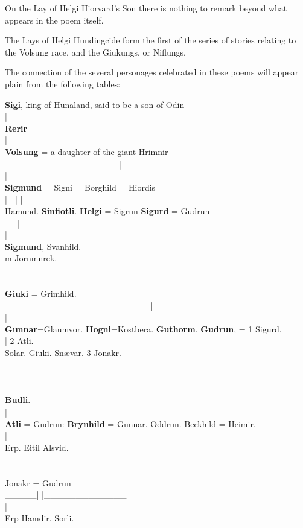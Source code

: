 On the Lay of Helgi Hiorvard's Son there is nothing to remark beyond
what appears in the poem itself.

The Lays of Helgi Hundingcide form the first of the series of stories
relating to the Volsung race, and the Giukungs, or Niflungs.

The connection of the several personages celebrated in these poems
will appear plain from the following tables:

\textbf{Sigi}, king of Hunaland, said to be a son of Odin\\
|\\
\textbf{Rerir}\\
|\\
\textbf{Volsung} = a daughter of the giant Hrimnir\\
\_\_\_\_\_\_\_\_\_\_\_\_\_\_\_\_\_\_|\\
|\\
\textbf{Sigmund} = Signi = Borghild = Hiordis\\
| | | |\\
Hamund. \textbf{Sinfiotli}. \textbf{Helgi} = Sigrun \textbf{Sigurd} = Gudrun\\
\_\_|\_\_\_\_\_\_\_\_\_\_\_\_\\
| |\\
\textbf{Sigmund}, Svanhild.\\
m Jornmnrek.\\
\\
\\
\textbf{Giuki} = Grimhild.\\
\_\_\_\_\_\_\_\_\_\_\_\_\_\_\_\_\_\_\_\_\_\_\_|\\
|\\
\textbf{Gunnar}=Glaumvor. \textbf{Hogni}=Kostbera. \textbf{Guthorm}. \textbf{Gudrun}, = 1 Sigurd.\\
| 2 Atli.\\
Solar. Giuki. Snævar. 3 Jonakr.\\
\\
\\
\\
\textbf{Budli}.\\
|\\
\textbf{Atli} = Gudrun: \textbf{Brynhild} = Gunnar. Oddrun. Beckhild = Heimir.\\
| |\\
Erp. Eitil Alsvid.\\
\\
\\
Jonakr = Gudrun\\
\_\_\_\_\_| |\_\_\_\_\_\_\_\_\_\_\_\_\_\\
| |\\
Erp Hamdir. Sorli.

